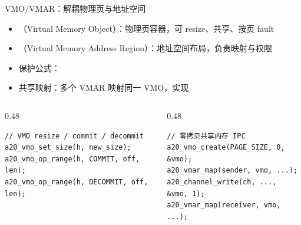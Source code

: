 \documentclass[aspectratio=1610]{beamer}
\begin{document}
\begin{frame}[fragile]{VMO/VMAR：解耦物理页与地址空间}
    \begin{itemize}
        \item {}（Virtual Memory Object）：物理页容器，可 resize、共享、按页 fault
        \item {}（Virtual Memory Address Region）：地址空间布局，负责映射与权限
        \item 保护公式：
        \item 共享映射：多个 VMAR 映射同一 VMO，实现
    \end{itemize}
    \vspace{0.2em}
    \begin{columns}[t]
        \begin{column}{0.48\textwidth}
            \begin{lstlisting}
// VMO resize / commit / decommit
a20_vmo_set_size(h, new_size);
a20_vmo_op_range(h, COMMIT, off, len);
a20_vmo_op_range(h, DECOMMIT, off, len);
            \end{lstlisting}
        \end{column}
        \begin{column}{0.48\textwidth}
            \begin{lstlisting}
// 零拷贝共享内存 IPC
a20_vmo_create(PAGE_SIZE, 0, &vmo);
a20_vmar_map(sender, vmo, ...);
a20_channel_write(ch, ..., &vmo, 1);
a20_vmar_map(receiver, vmo, ...);
            \end{lstlisting}
        \end{column}
    \end{columns}
    \vspace{0.2em}
\end{frame}
\end{document}
